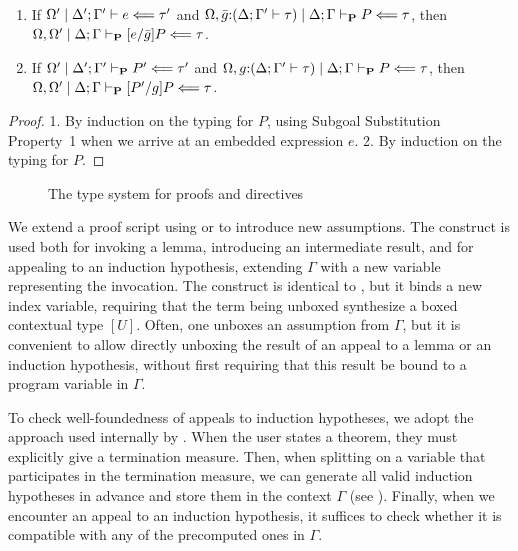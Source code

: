 \begin{thm} ~
  \begin{enumerate}
  \item
    If $\Omega^\prime\mid\Delta^\prime; \Gamma^\prime \vdash e \Longleftarrow \tau^\prime$
    and $\Omega,\bar g{:}(\Delta; \Gamma^\prime \vdash \tau)\mid\Delta; \Gamma \vdash_\mathbf{P} P \Longleftarrow \tau$,
    then
    $\prfchkjudg{%
      \Omega,\Omega^\prime\mid\goalctx{}%
    }{\psubst{e/\bar g}{P}}{\tau}$.

  \item
    If $\Omega^\prime\mid\Delta^\prime; \Gamma^\prime \vdash_\mathbf{P} P^\prime \Longleftarrow \tau^\prime$
    and $\Omega,g{:}(\Delta; \Gamma^\prime \vdash \tau)\mid\Delta; \Gamma \vdash_\mathbf{P} P \Longleftarrow \tau$,
    then
    $\prfchkjudg{%
      \Omega,\Omega^\prime\mid\goalctx{}%
    }{\psubst{P^\prime/g}{P}}{\tau}$.
  \end{enumerate}
\end{thm}
\begin{proof}
  1. By induction on the typing for $P$, using Subgoal Substitution Property~1
  when we arrive at an embedded expression $e$.
  2. By induction on the typing for $P$.
\end{proof}

\begin{figure}[tp]
  \caption{%
    The type system for \Harpoon{} proofs and directives%
  }%
  \label{fig:harpoon-types}%
\end{figure}

We extend a proof script using \kwby{} or \kwunbox{} to introduce new
assumptions.
The \kwby{} construct is used both for invoking a lemma, introducing
an intermediate result, and for appealing to an
induction hypothesis, extending $\Gamma$ with a new variable representing the
invocation.
The \kwunbox{} construct is identical to \kwby, but it binds a new
index variable, requiring that the term being unboxed synthesize a boxed
contextual type $[U]$.
Often, one unboxes an assumption from $\Gamma$, but it is convenient to allow
directly unboxing the result of an appeal to a lemma or an induction hypothesis,
without first requiring that this result be bound to a program variable in
$\Gamma$.

To check well-foundedness of appeals to induction hypotheses, we adopt the
approach used internally by \Beluga.
When the user states a theorem, they must explicitly give a termination measure.
Then, when splitting on a variable that participates in the termination measure,
we can generate all valid induction hypotheses in advance and store them in the
context $\Gamma$ (see \cite{Pientka:TLCA15}).
Finally, when we encounter an appeal to an induction hypothesis, it suffices to
check whether it is compatible with any of the precomputed ones in $\Gamma$.

